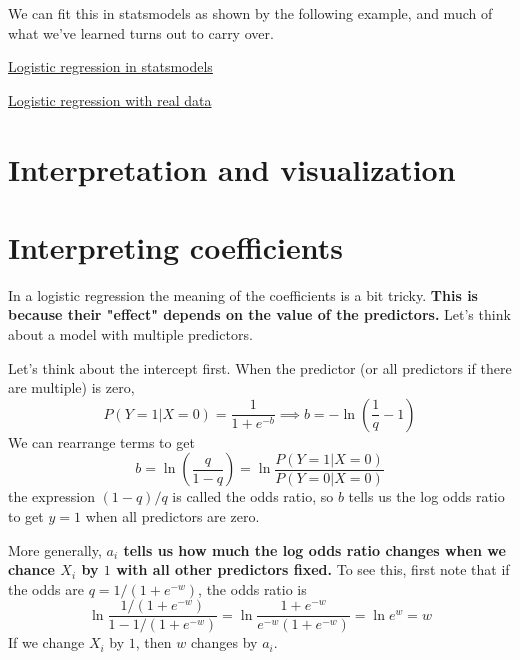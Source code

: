 We can fit this in statsmodels as shown by the following example, and much of what we've learned turns out to carry over. 

\begin{example}
\href{https://colab.research.google.com/drive/1_oMrxtIlJ-EdW1ozmlydx0A9qrA-sVKm#scrollTo=NvKur135DQbe&line=1&uniqifier=1}{Logistic regression in statsmodels}
\end{example}


\begin{example}
\href{https://colab.research.google.com/drive/1_oMrxtIlJ-EdW1ozmlydx0A9qrA-sVKm#scrollTo=jWjC5045V42_}{Logistic regression with real data}
\end{example}







\section{Interpretation and visualization}

\section{Interpreting coefficients}

In a logistic regression the meaning of the coefficients is a bit tricky. {\bf This is because their "effect" depends on the value of the predictors.} Let's think about a model with multiple predictors.


Let's think about the intercept first. When the predictor (or all predictors if there are multiple) is zero, 
\begin{equation}
P(Y=1|X=0) = \frac{1}{1 + e^{-b}}\implies b= - \ln\left(\frac{1}{q} -1 \right)
\end{equation}
We can rearrange terms to get
\begin{equation}
b = \ln \left(\frac{q}{1-q} \right) = \ln \frac{P(Y=1|X=0)}{P(Y=0|X=0)}
\end{equation}
the expression $(1-q)/q$ is called the odds ratio, so $b$ tells us the log odds ratio to get $y=1$ when all predictors are zero. 

More generally, {\bf $a_i$ tells us how much the log odds ratio changes when we chance $X_i$ by $1$ with all other predictors fixed.} To see this, first note that if the odds are $q = 1/(1+e^{-w})$, the odds ratio is 
\begin{equation}
\ln \frac{1/(1+e^{-w})}{1-1/(1+e^{-w})} = \ln \frac{1+e^{-w}}{e^{-w}(1+e^{-w})}  = \ln e^w = w
\end{equation}
If we change $X_i$ by $1$, then $w$ changes by $a_i$. 


